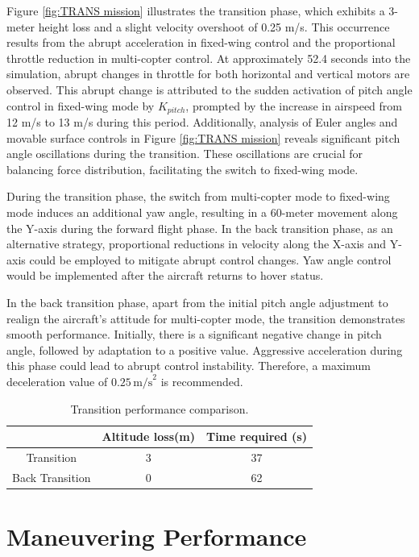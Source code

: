 Figure \ref{fig:TRANS mission} illustrates the transition phase, which exhibits a 3-meter height loss and a slight velocity overshoot of 0.25 m/s. This occurrence results from the abrupt acceleration in fixed-wing control and the proportional throttle reduction in multi-copter control. At approximately 52.4 seconds into the simulation, abrupt changes in throttle for both horizontal and vertical motors are observed. This abrupt change is attributed to the sudden activation of pitch angle control in fixed-wing mode by $K_{pitch}$, prompted by the increase in airspeed from 12 m/s to 13 m/s during this period. Additionally, analysis of Euler angles and movable surface controls in Figure \ref{fig:TRANS mission} reveals significant pitch angle oscillations during the transition. These oscillations are crucial for balancing force distribution, facilitating the switch to fixed-wing mode.

During the transition phase, the switch from multi-copter mode to fixed-wing mode induces an additional yaw angle, resulting in a 60-meter movement along the Y-axis during the forward flight phase. In the back transition phase, as an alternative strategy, proportional reductions in velocity along the X-axis and Y-axis could be employed to mitigate abrupt control changes. Yaw angle control would be implemented after the aircraft returns to hover status.

In the back transition phase, apart from the initial pitch angle adjustment to realign the aircraft's attitude for multi-copter mode, the transition demonstrates smooth performance. Initially, there is a significant negative change in pitch angle, followed by adaptation to a positive value. Aggressive acceleration during this phase could lead to abrupt control instability. Therefore, a maximum deceleration value of $0.25 \, \text{m/s}^2$ is recommended.


\begin{table}
    \centering
    \begin{tabular}{ccc}
    \hline
         & Altitude loss(m) &  Time required (s) \\
        \hline
        Transition & 3 & 37 \\
        Back Transition & 0 & 62\\
    \hline
    \end{tabular}
    \caption{ Transition performance comparison.}
    \label{tab: Transition performance comparison}
\end{table}

\section{Maneuvering Performance}

